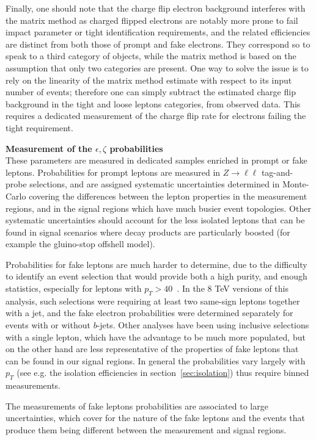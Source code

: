 Finally, one should note that the charge flip electron background interferes with the matrix method 
as charged flipped electrons are notably more prone to fail impact parameter or tight identification requirements, 
and the related efficiencies are distinct from both those of prompt and fake electrons. 
They correspond so to speak to a third category of objects, while the matrix method is based on the assumption that only two categories are present. 
One way to solve the issue is to rely on the linearity of the matrix method estimate with respect to its input number of events; 
therefore one can simply subtract the estimated charge flip background in the tight and loose leptons categories, from observed data. 
This requires a dedicated measurement of the charge flip rate for electrons failing the tight requirement. 
\\
\par{\bf Measurement of the $\epsilon,\zeta$ probabilities\\}
These parameters are measured in dedicated samples enriched in prompt or fake leptons. 
Probabilities for prompt leptons are measured in $Z\to \ell\ell$ tag-and-probe selections, 
and are assigned systematic uncertainties determined in Monte-Carlo covering the 
differences between the lepton properties in the measurement regions, 
and in the signal regions which have much busier event topologies. 
Other systematic uncertainties should account for the less isolated leptons that can be 
found in signal scenarios where decay products are particularly boosted (for example the gluino-stop offshell model). 

Probabilities for fake leptons are much harder to determine, due to the difficulty to identify 
an event selection that would provide both a high purity, and enough statistics, especially for leptons with $p_T>40$~\GeV. 
In the 8 TeV versions of this analysis, such selections were requiring at least two same-sign leptons together with a jet, 
and the fake electron probabilities were determined separately for events with or without $b$-jets. 
Other analyses have been using inclusive selections with a single lepton, 
which have the advantage to be much more populated, but on the other hand 
are less representative of the properties of fake leptons that can be found in our signal regions. 
In general the probabilities vary largely with $p_T$ (see e.g. the isolation efficiencies in section~\ref{sec:isolation}) thus require binned measurements. 

The measurements of fake leptons probabilities are associated to large uncertainties, 
which cover for the nature of the fake leptons and the events that produce them 
being different between the measurement and signal regions. 

